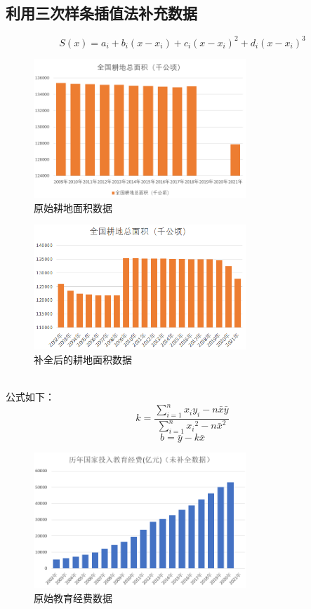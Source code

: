 \documentclass[UTF8]{article}
\begin{document}
	\subsection{利用三次样条插值法补充数据}
	$$
		S(x)=a_i+b_i(x-x_i)+c_i(x-x_i)^2+d_i(x-x_i)^3
		\label{czgs}
	$$
	\newpage
	\begin{figure}[htb]
		\centering
		\includegraphics[width=8cm]{pictures/ysgdmj.png}
		\caption{原始耕地面积数据}
		\label{ysgdmj}
	\end{figure}
	\begin{figure}[htb]
		\centering
		\includegraphics[width=8cm]{pictures/bcgdmj.png}
		\caption{补全后的耕地面积数据}
		\label{bcgdmj}
	\end{figure}
	~\\公式如下：
	$$
	k=\frac{\sum_{i=1}^n x_iy_i-n\bar{x}\bar{y}}{\sum_{i=1}^{n}{x_i}^2-n{\bar{x}}^2}
	$$
	\vspace{+5pt}
	$$
	b=\bar{y}-k\bar{x}
	$$
	\newpage
	\begin{figure}[htb]
		\centering
		\includegraphics[width=8cm]{pictures/ysjyjf.png}
		\caption{原始教育经费数据}
		\label{ysjyjf}
	\end{figure}
\end{document}
